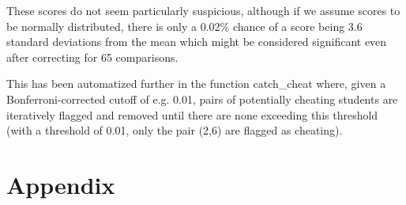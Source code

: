 \documentclass{article}
\begin{document}
These scores do not seem particularly suspicious, although if we assume scores to be normally distributed, there is only a 0.02\% chance of a score being 3.6 standard deviations from the mean which might be considered significant even after correcting for 65 comparisons.

This has been automatized further in the function catch\_cheat where, given a Bonferroni-corrected cutoff of e.g. 0.01, pairs of potentially cheating students are iteratively flagged and removed until there are none exceeding this threshold (with a threshold of 0.01, only the pair (2,6) are flagged as cheating).

\newpage

\section{Appendix}


\end{document}
